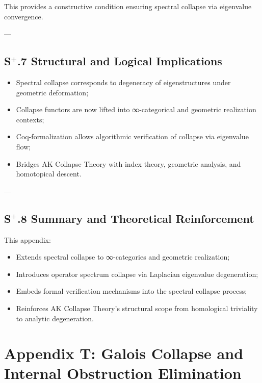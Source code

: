 \documentclass[11pt]{article}
\begin{document}
This provides a constructive condition ensuring spectral collapse via eigenvalue convergence.

---

\subsection*{S$^{+}$.7 Structural and Logical Implications}

\begin{itemize}
    \item Spectral collapse corresponds to degeneracy of eigenstructures under geometric deformation;
    \item Collapse functors are now lifted into ∞-categorical and geometric realization contexts;
    \item Coq-formalization allows algorithmic verification of collapse via eigenvalue flow;
    \item Bridges AK Collapse Theory with index theory, geometric analysis, and homotopical descent.
\end{itemize}

---

\subsection*{S$^{+}$.8 Summary and Theoretical Reinforcement}

This appendix:

\begin{itemize}
    \item Extends spectral collapse to ∞-categories and geometric realization;
    \item Introduces operator spectrum collapse via Laplacian eigenvalue degeneration;
    \item Embeds formal verification mechanisms into the spectral collapse process;
    \item Reinforces AK Collapse Theory's structural scope from homological triviality to analytic degeneration.
\end{itemize}




\section*{Appendix T: Galois Collapse and Internal Obstruction Elimination}
\end{document}
